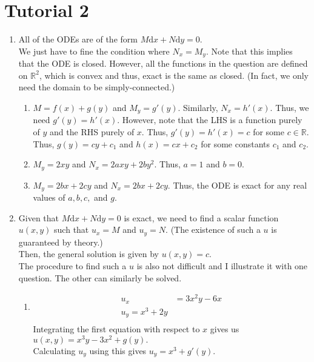 \documentclass[12pt]{article}
\theoremstyle{definition}
\numberwithin{thm}{section}
\newcommand{\dd}{{\mathrm d}}
\begin{document}
\newpage\section{Tutorial 2}
\begin{enumerate}[leftmargin=*, label = Q.\arabic*.] 
	\item All of the ODEs are of the form $M\dd x + N\dd y = 0.$\\
	We just have to fine the condition where $N_x = M_y.$ Note that this implies that the ODE is closed. However, all the functions in the question are defined on $\mathbb{R}^2$, which is convex and thus, exact is the same as closed. (In fact, we only need the domain to be simply-connected.)
	\begin{enumerate}[label = (\roman*)] 
		\item $M = f(x) + g(y)$ and $M_y = g'(y).$ Similarly, $N_x = h'(x).$ Thus, we need $g'(y) = h'(x).$ However, note that the LHS is a function purely of $y$ and the RHS purely of $x.$ Thus, $g'(y) = h'(x) = c$ for some $c \in \mathbb{R}.$ Thus, $g(y) = cy + c_1$ and $h(x) = cx + c_2$ for some constants $c_1$ and $c_2.$
		\item $M_y = 2xy$ and $N_x = 2axy + 2by^2.$ Thus, $a = 1$ and $b = 0.$
		\item $M_y = 2bx + 2cy$ and $N_x = 2bx + 2cy.$ Thus, the ODE is exact for any real values of $a, b, c,$ and $g.$
	\end{enumerate}
	\item Given that $M\dd x + N\dd y = 0$ is exact, we need to find a scalar function $u(x, y)$ such that $u_x = M$ and $u_y = N.$ (The existence of such a $u$ is guaranteed by theory.)\\
	Then, the general solution is given by $u(x, y) = c.$\\
	The procedure to find such a $u$ is also not difficult and I illustrate it with one question. The other can similarly be solved.
	\begin{enumerate}[label = (\roman*)] 
		\item 
		\begin{align} 
			u_x &= 3x^2y - 6x \label{eq:ux}\\
			u_y = x^3 + 2y \label{eq:uy}\\
		\end{align}
		Integrating the first equation with respect to $x$ gives us $u(x, y) = x^3y - 3x^2 + g(y).$\\
		Calculating $u_y$ using this gives $u_y = x^3 + g'(y).$ \\

\end{enumerate}
\end{enumerate}
\end{document}

